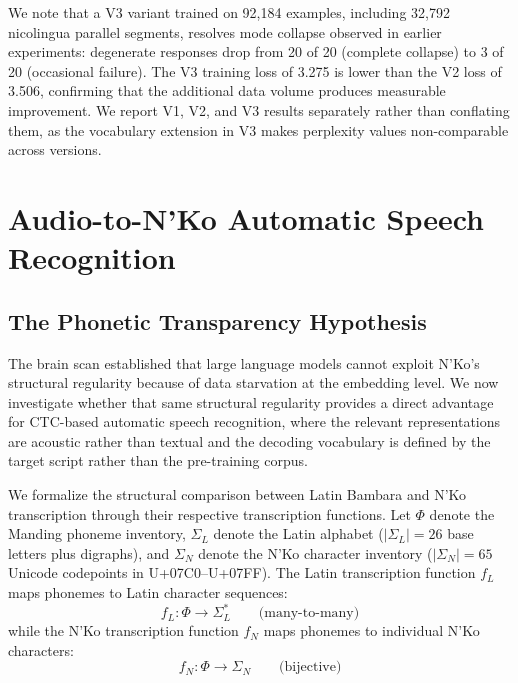 \documentclass[11pt]{article}
\newcommand{\nko}{N'Ko}
\begin{document}
We note that a V3 variant trained on 92,184 examples, including 32,792 nicolingua parallel segments, resolves mode collapse observed in earlier experiments: degenerate responses drop from 20 of 20 (complete collapse) to 3 of 20 (occasional failure). The V3 training loss of 3.275 is lower than the V2 loss of 3.506, confirming that the additional data volume produces measurable improvement. We report V1, V2, and V3 results separately rather than conflating them, as the vocabulary extension in V3 makes perplexity values non-comparable across versions.

\section{Audio-to-\nko{} Automatic Speech Recognition}
\label{sec:asr}

\subsection{The Phonetic Transparency Hypothesis}
\label{sec:transparency}

The brain scan established that large language models cannot exploit \nko{}'s structural regularity because of data starvation at the embedding level. We now investigate whether that same structural regularity provides a direct advantage for CTC-based automatic speech recognition, where the relevant representations are acoustic rather than textual and the decoding vocabulary is defined by the target script rather than the pre-training corpus.

We formalize the structural comparison between Latin Bambara and \nko{} transcription through their respective transcription functions. Let $\Phi$ denote the Manding phoneme inventory, $\Sigma_L$ denote the Latin alphabet ($|\Sigma_L| = 26$ base letters plus digraphs), and $\Sigma_N$ denote the \nko{} character inventory ($|\Sigma_N| = 65$ Unicode codepoints in U+07C0--U+07FF). The Latin transcription function $f_L$ maps phonemes to Latin character sequences:
\begin{equation}
f_L: \Phi \to \Sigma_L^* \qquad \text{(many-to-many)}
\label{eq:latin_map}
\end{equation}
while the \nko{} transcription function $f_N$ maps phonemes to individual \nko{} characters:
\begin{equation}
f_N: \Phi \to \Sigma_N \qquad \text{(bijective)}
\label{eq:nko_map}
\end{equation}
\end{document}
